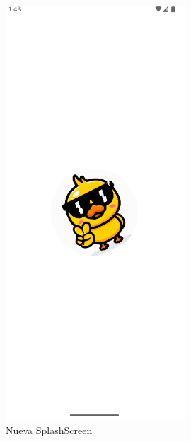 \documentclass[a4paper,openright,12pt]{article}
\begin{document}
\begin{figure}[htp]
    \centering
    \begin{minipage}{0.3\textwidth}
        \centering
        \includegraphics[width=0.6\textwidth]{Images/Vista_It3_3.png} 
        \caption{Nueva SplashScreen}
        \label{fig:Nueva SplashScreen}
    \end{minipage}
    \hfill
    \begin{minipage}{0.3\textwidth}
        \centering

\end{minipage}
\end{figure}
\end{document}

